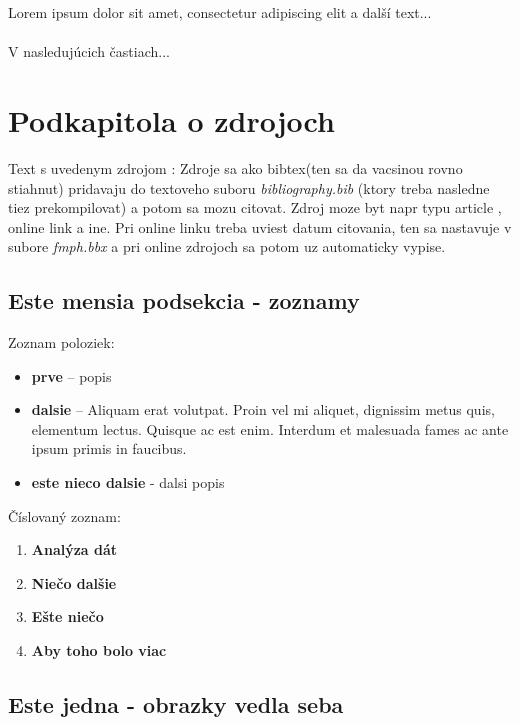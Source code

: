 Lorem ipsum dolor sit amet, consectetur adipiscing elit a další text...
\\\\
V nasledujúcich častiach...

\section{Podkapitola o zdrojoch}
Text s uvedenym zdrojom \cite{vis}:
Zdroje sa ako bibtex(ten sa da vacsinou rovno stiahnut) pridavaju do textoveho suboru \emph{bibliography.bib} (ktory treba nasledne tiez prekompilovat) a potom sa mozu citovat. Zdroj moze byt napr typu article \cite{taxonomia},  online link a ine. Pri online linku \cite{anemone}
treba uviest datum citovania, ten sa nastavuje v subore \emph{fmph.bbx} a pri online zdrojoch sa potom uz automaticky vypise.
\subsection{Este mensia podsekcia - zoznamy}

Zoznam poloziek:
\begin{itemize}
	\item \textbf{prve} – popis
	\item \textbf{dalsie} – Aliquam erat volutpat. Proin vel mi aliquet, dignissim metus quis, elementum lectus. Quisque ac est enim. Interdum et malesuada fames ac ante ipsum primis in faucibus.
	\item \textbf{este nieco dalsie} - dalsi popis
\end{itemize}

  Číslovaný zoznam:
  \begin{enumerate}
    \item\textbf{Analýza dát}
    \item\textbf{Niečo dalšie}
    \item\textbf{Ešte niečo}
    \item\textbf{Aby toho bolo viac}
  \end{enumerate}

\subsection{Este jedna - obrazky vedla seba}

